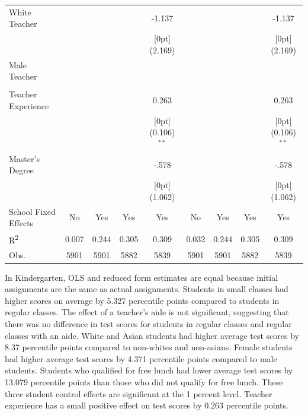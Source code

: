\documentclass[a4paper,11pt]{article}
\begin{document}
\begin{table}[H]
\begin{tabular*}{\textwidth}{@{\extracolsep{\fill}}lcccccccc}
	White Teacher &	&	&	&	-1.137  &	&	&	&	-1.137\\
	&	&	&	&	\raisebox{.7ex}[0pt]{\scriptsize (2.169)} 	&	&	&	&	\raisebox{.7ex}[0pt]{\scriptsize (2.169)} \\
	Male Teacher &	&	&	&	 &	&	&	&	\\
	&	&	&	& &	&	&	&		\\
	Teacher Experience &	&	&	&	0.263  &	&	&	&	0.263 \\
	&	&	&	&	\raisebox{.7ex}[0pt]{\scriptsize (0.106)$^{**}$} 	&	&	&	&	\raisebox{.7ex}[0pt]{\scriptsize (0.106)$^{**}$}\\
	Master's Degree &	&	&	&	-.578 &	&	&	&	-.578\\
	&	&	&	&	\raisebox{.7ex}[0pt]{\scriptsize (1.062)}&	&	&	&	\raisebox{.7ex}[0pt]{\scriptsize (1.062)} \\
	School Fixed Effects &	No  & Yes &	Yes & Yes &	No & Yes &	Yes & Yes \\
	R\textsuperscript{2} & 0.007 & 0.244 & 0.305 & 0.309 & 0.032 & 0.244 & 0.305 & 0.309\\
	Obs. &	5901 &	5901 &	5882 &	5839  &	5901 &	5901 &	5882 &	5839 \\
	\hline\hline				
\end{tabular*}		
\end{table}		

In Kindergarten, OLS and reduced form estimates are equal because initial assignments are the same as actual assignments. Students in small classes had higher scores on average by 5.327 percentile points compared to students in regular classes. The effect of a teacher's aide is not significant, suggesting that there was no difference in test scores for students in regular classes and regular classes with an aide. White and Asian students had higher average test scores by 8.37 percentile points compared to non-whites and non-asians. Female students had higher average test scores by 4.371 percentile points compared to male students. Students who qualified for free lunch had lower average test scores by 13.079 percentile points than those who did not qualify for free lunch. These three student control effects are significant at the 1 percent level. Teacher experience has a small positive effect on test scores by 0.263 percentile points. \par
\end{document}
